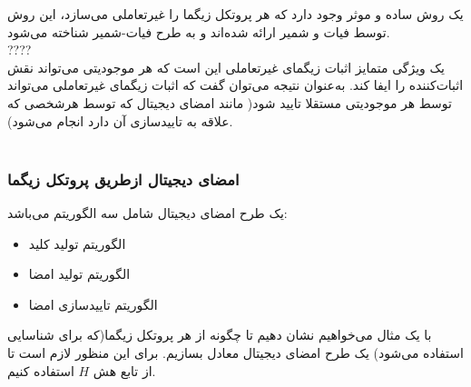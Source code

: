 یک روش ساده و موثر وجود دارد که هر پروتکل زیگما را غیرتعاملی می‌سازد، این روش توسط فیات و شمیر ارائه شده‌اند و به طرح فیات-شمیر شناخته می‌شود.
\\
????
\\
یک ویژگی متمایز اثبات زیگمای غیرتعاملی این است که هر موجودیتی می‌تواند نقش اثبات‌کننده را ایفا کند. به‌عنوان نتیجه می‌توان گفت که اثبات زیگمای غیرتعاملی می‌تواند توسط هر موجودیتی مستقلا تایید شود( مانند امضای دیجیتال که توسط هرشخصی که علاقه به تاییدسازی آن دارد انجام می‌شود).
\\
\\
\subsubsection{امضای دیجیتال ازطریق پروتکل زیگما}\label{ds_from_sigma_protocol}

یک طرح امضای دیجیتال شامل سه الگوریتم می‌باشد:
\begin{itemize}
	\item 
	الگوریتم تولید کلید
	\item 
	الگوریتم تولید امضا
	\item 
	الگوریتم تاییدسازی امضا
\end{itemize}
با یک مثال می‌خواهیم نشان دهیم تا چگونه از هر پروتکل‌ زیگما(که برای شناسایی استفاده می‌شود) یک طرح امضای دیجیتال معادل بسازیم. برای این منظور لازم است تا از تابع هش
$H$
استفاده کنیم.
\\

